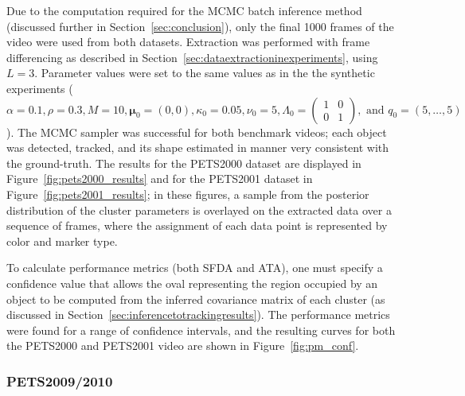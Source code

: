 \documentclass{article}
\begin{document}
Due to the computation required for the MCMC batch inference method (discussed further in Section~\ref{sec:conclusion}), only the final 1000 frames of the video were used from both datasets. Extraction was performed with frame differencing as described in Section~\ref{sec:dataextractioninexperiments}, using $L=3$. Parameter values were set to the same values as in the the synthetic experiments ($\alpha = 0.1, \rho = 0.3, M = 10, \boldsymbol{\mu}_{0} = (0,0), \kappa_{0} = 0.05, \nu_{0} = 5, \Lambda_{0} = \left( \begin{smallmatrix} 1&0\\ 0&1 \end{smallmatrix} \right), \text{ and } q_{0} = (5, \ldots, 5)$). The MCMC sampler was successful for both benchmark videos; each object was detected, tracked, and its shape estimated in manner very consistent with the ground-truth. The results for the PETS2000 dataset are displayed in Figure~\ref{fig:pets2000_results} and for the PETS2001 dataset in Figure~\ref{fig:pets2001_results}; in these figures, a sample from the posterior distribution of the cluster parameters is overlayed on the extracted data over a sequence of frames, where the assignment of each data point is represented by color and marker type.


To calculate performance metrics (both SFDA and ATA), one must specify a confidence value that allows the oval representing the region occupied by an object to be computed from the inferred covariance matrix of each cluster (as discussed in Section~\ref{sec:inferencetotrackingresults}). The performance metrics were found for a range of confidence intervals, and the resulting curves for both the PETS2000 and PETS2001 video are shown in Figure~\ref{fig:pm_conf}.



\subsubsection{PETS2009/2010}
\label{sec:pets20092010}
\end{document}
